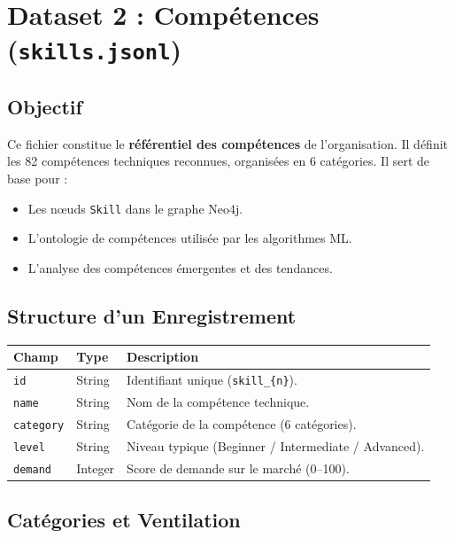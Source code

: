 \documentclass[12pt,a4paper]{article}
\begin{document}
\section{Dataset 2 : Compétences (\texttt{skills.jsonl})}

\subsection{Objectif}

Ce fichier constitue le \textbf{référentiel des compétences} de l'organisation. Il définit les 82 compétences techniques reconnues, organisées en 6 catégories. Il sert de base pour :
\begin{itemize}[leftmargin=*]
    \item Les nœuds \texttt{Skill} dans le graphe Neo4j.
    \item L'ontologie de compétences utilisée par les algorithmes ML.
    \item L'analyse des compétences émergentes et des tendances.
\end{itemize}

\subsection{Structure d'un Enregistrement}

\begin{longtable}{|p{3.5cm}|p{2.5cm}|p{7.5cm}|}
\hline
\rowcolor{bleu!15}
\textbf{Champ} & \textbf{Type} & \textbf{Description} \\
\hline
\texttt{id} & String & Identifiant unique (\texttt{skill\_\{n\}}). \\
\hline
\texttt{name} & String & Nom de la compétence technique. \\
\hline
\texttt{category} & String & Catégorie de la compétence (6 catégories). \\
\hline
\texttt{level} & String & Niveau typique (Beginner / Intermediate / Advanced). \\
\hline
\texttt{demand} & Integer & Score de demande sur le marché (0--100). \\
\hline
\end{longtable}

\subsection{Catégories et Ventilation}
\end{document}
